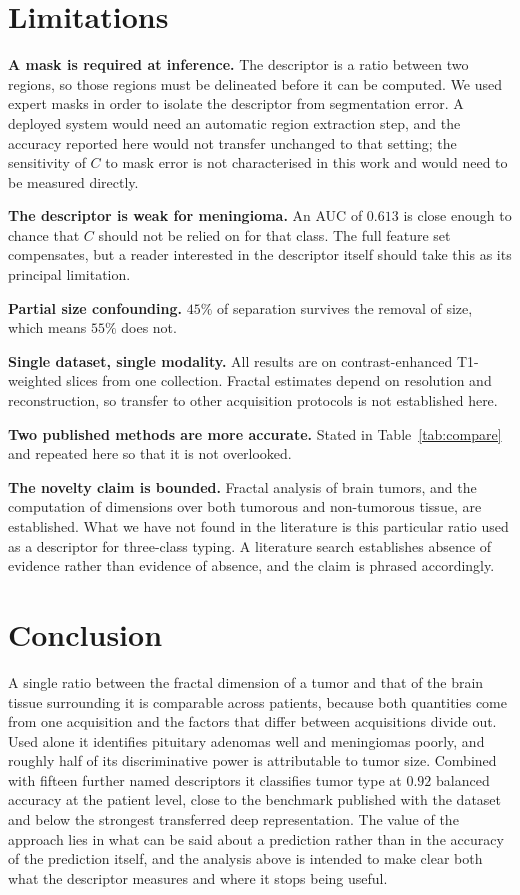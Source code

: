 \documentclass[journal]{IEEEtran}
\begin{document}
\section{Limitations}
\label{sec:limits}

\textbf{A mask is required at inference.} The descriptor is a ratio between two
regions, so those regions must be delineated before it can be computed. We used
expert masks in order to isolate the descriptor from segmentation error. A
deployed system would need an automatic region extraction step, and the accuracy
reported here would not transfer unchanged to that setting; the sensitivity of
$C$ to mask error is not characterised in this work and would need to be measured
directly.

\textbf{The descriptor is weak for meningioma.} An AUC of $0.613$ is close
enough to chance that $C$ should not be relied on for that class. The full
feature set compensates, but a reader interested in the descriptor itself should
take this as its principal limitation.

\textbf{Partial size confounding.} $45\%$ of separation survives the removal of
size, which means $55\%$ does not.

\textbf{Single dataset, single modality.} All results are on contrast-enhanced
T1-weighted slices from one collection. Fractal estimates depend on resolution
and reconstruction, so transfer to other acquisition protocols is not established
here.

\textbf{Two published methods are more accurate.} Stated in
Table~\ref{tab:compare} and repeated here so that it is not overlooked.

\textbf{The novelty claim is bounded.} Fractal analysis of brain tumors, and the
computation of dimensions over both tumorous and non-tumorous tissue, are
established. What we have not found in the literature is this particular ratio
used as a descriptor for three-class typing. A literature search establishes
absence of evidence rather than evidence of absence, and the claim is phrased
accordingly.

\section{Conclusion}

A single ratio between the fractal dimension of a tumor and that of the brain
tissue surrounding it is comparable across patients, because both quantities come
from one acquisition and the factors that differ between acquisitions divide out.
Used alone it identifies pituitary adenomas well and meningiomas poorly, and
roughly half of its discriminative power is attributable to tumor size. Combined
with fifteen further named descriptors it classifies tumor type at $0.92$
balanced accuracy at the patient level, close to the benchmark published with the
dataset and below the strongest transferred deep representation. The value of the
approach lies in what can be said about a prediction rather than in the accuracy
of the prediction itself, and the analysis above is intended to make clear both
what the descriptor measures and where it stops being useful.
\end{document}
